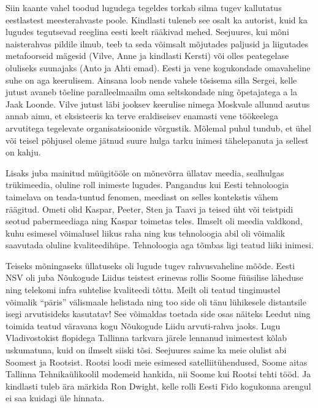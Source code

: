 Siin kaante vahel toodud lugudega tegeldes torkab silma tugev kallutatus eestlastest meesterahvaste poole. Kindlasti tuleneb see osalt ka autorist, kuid ka lugudes tegutsevad reeglina eesti keelt rääkivad mehed. Seejuures, kui mõni naisterahvas pildile ilmub, teeb ta seda võimsalt mõjutades paljusid ja liigutades metafoorseid mägesid (Vilve, Anne ja kindlasti Kersti) või olles peategelase oluliseks suunajaks (Anto ja Ahti emad). Eesti ja vene kogukondade omavaheline suhe on aga keerulisem. Ainsana loob nende vahele tõsisema silla Sergei, kelle jutust avaneb tõeline paralleelmaailm oma seltskondade ning õpetajatega a la Jaak Loonde. Vilve jutust läbi jooksev keerulise nimega Moskvale allunud asutus annab aimu, et eksisteeris ka terve eraldiseisev enamasti vene töökeelega arvutitega tegelevate organisatsioonide võrgustik. Mõlemal puhul tundub, et ühel või teisel põhjusel oleme jätnud suure hulga tarku inimesi tähelepanuta ja sellest on kahju.

Lisaks juba mainitud müügitööle on mõnevõrra üllatav meedia, sealhulgas trükimeedia, oluline roll inimeste lugudes. Pangandus kui Eesti tehnoloogia taimelava on teada-tuntud fenomen, meediast on selles kontekstis vähem räägitud. Ometi olid Kaspar, Peeter, Sten ja Taavi ja teised üht või teistpidi seotud pabermeediaga ning Kaspar toimetas teles. Ilmselt oli meedia valdkond, kuhu esimesel võimalusel liikus raha ning kus tehnoloogia abil oli võimalik saavutada oluline kvaliteedihüpe. Tehnoloogia aga tõmbas ligi teatud liiki inimesi.

Teiseks mõningaseks üllatuseks oli lugude tugev rahvusvaheline mõõde. Eesti NSV oli juba Nõukogude Liidus teistest erinevas rollis Soome füüsilise läheduse ning telekomi infra suhtelise kvaliteedi tõttu. Meilt oli teatud tingimustel võimalik \enquote{päris} välismaale helistada ning too side oli tänu lühikesele distantsile isegi arvutisideks kasutatav! See võimaldas toetada side osas näiteks Leedut ning toimida teatud väravana kogu Nõukogude Liidu arvuti-rahva jaoks. Lugu Vladivostokist flopidega Tallinna tarkvara järele lennanud inimestest kõlab uskumatuna, kuid on ilmselt siiski tõsi. Seejuures saime ka meie olulist abi Soomest ja Rootsist. Rootsi loodi meie esimesed satelliitühendused, Soome aitas Tallinna Tehnikaülikoolil modemeid hankida, nii Soome kui Rootsi tehti tööd. Ja kindlasti tuleb ära märkida Ron Dwight, kelle rolli Eesti Fido kogukonna arengul ei saa kuidagi üle hinnata. 

